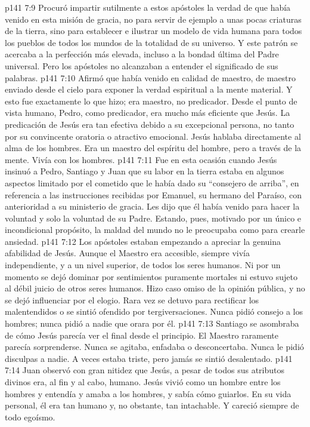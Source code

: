 \vs p141 7:9 Procuró impartir sutilmente a estos apóstoles la verdad de que había venido en esta misión de gracia, no para servir de ejemplo a unas pocas criaturas de la tierra, sino para establecer e ilustrar un modelo de vida humana para todos los pueblos de todos los mundos de la totalidad de su universo. Y este patrón se acercaba a la perfección más elevada, incluso a la bondad última del Padre universal. Pero los apóstoles no alcanzaban a entender el significado de sus palabras.
\vs p141 7:10 Afirmó que había venido en calidad de maestro, de maestro enviado desde el cielo para exponer la verdad espiritual a la mente material. Y esto fue exactamente lo que hizo; era maestro, no predicador. Desde el punto de vista humano, Pedro, como predicador, era mucho más eficiente que Jesús. La predicación de Jesús era tan efectiva debido a su excepcional persona, no tanto por su convincente oratoria o atractivo emocional. Jesús hablaba directamente al alma de los hombres. Era un maestro del espíritu del hombre, pero a través de la mente. Vivía con los hombres.
\vs p141 7:11 Fue en esta ocasión cuando Jesús insinuó a Pedro, Santiago y Juan que su labor en la tierra estaba en algunos aspectos limitado por el cometido que le había dado su “consejero de arriba”, en referencia a las instrucciones recibidas por Emanuel, su hermano del Paraíso, con anterioridad a su ministerio de gracia. Les dijo que él había venido para hacer la voluntad y solo la voluntad de su Padre. Estando, pues, motivado por un único e incondicional propósito, la maldad del mundo no le preocupaba como para crearle ansiedad.
\vs p141 7:12 Los apóstoles estaban empezando a apreciar la genuina afabilidad de Jesús. Aunque el Maestro era accesible, siempre vivía independiente, y a un nivel superior, de todos los seres humanos. Ni por un momento se dejó dominar por sentimientos puramente mortales ni estuvo sujeto al débil juicio de otros seres humanos. Hizo caso omiso de la opinión pública, y no se dejó influenciar por el elogio. Rara vez se detuvo para rectificar los malentendidos o se sintió ofendido por tergiversaciones. Nunca pidió consejo a los hombres; nunca pidió a nadie que orara por él.
\vs p141 7:13 Santiago se asombraba de cómo Jesús parecía ver el final desde el principio. El Maestro raramente parecía sorprenderse. Nunca se agitaba, enfadaba o desconcertaba. Nunca le pidió disculpas a nadie. A veces estaba triste, pero jamás se sintió desalentado.
\vs p141 7:14 Juan observó con gran nitidez que Jesús, a pesar de todos sus atributos divinos era, al fin y al cabo, humano. Jesús vivió como un hombre entre los hombres y entendía y amaba a los hombres, y sabía cómo guiarlos. En su vida personal, él era tan humano y, no obstante, tan intachable. Y careció siempre de todo egoísmo.
